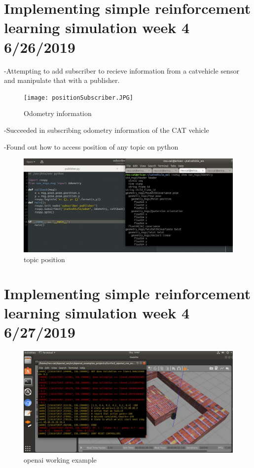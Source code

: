 \documentclass[12pt]{article}
\begin{document}
\section{Implementing simple reinforcement learning simulation week 4 6/26/2019}

-Attempting to add subscriber to recieve information from a catvehicle sensor and manipulate that with a publisher.

\begin{figure}[h]
\begin{center}
	\texttt{[image: positionSubscriber.JPG]}
	\caption{Odometry information}
\end{center}
\end{figure}

-Succeeded in subscribing odometry information of the CAT vehicle

-Found out how to access position of any topic on python


\begin{figure}[h]
\begin{center}
	\includegraphics[scale=.5]{subscriberAndNav.JPG}
	\caption{topic position}
\end{center}
\end{figure}

\section{Implementing simple reinforcement learning simulation week 4 6/27/2019}

\begin{figure}[h]
\begin{center}
	\includegraphics[scale=.3]{machinelearning1.JPG}
	\caption{openai working example}
\end{center}
\end{figure}
\end{document}
